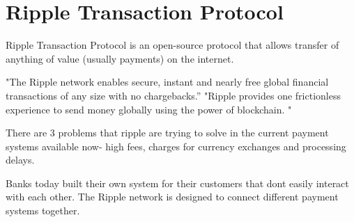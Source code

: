 \section{Ripple Transaction Protocol}

Ripple Transaction Protocol is an open-source protocol that allows transfer of anything of value (usually payments) on the internet.

"The Ripple network enables secure, instant and nearly free global financial transactions of any size with no chargebacks.” \cite{hid-sp18-506-RippleNetwork} "Ripple provides one frictionless experience to send money globally using the power of blockchain. "  \cite{hid-sp18-506-GlobalPayment}


There are 3 problems that ripple are trying to solve in the current payment systems
available now- high fees, charges for currency exchanges and processing delays. 

Banks today built their own system for their customers that dont easily interact with each other. The Ripple network is designed to connect different payment systems together.
